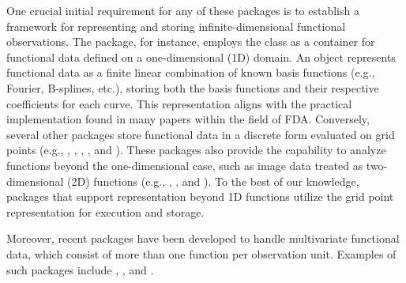 One crucial initial requirement for any of these packages is to establish a framework for representing and storing infinite-dimensional functional observations. The  package, for instance, employs the  class as a container for functional data defined on a one-dimensional (1D) domain. An  object represents functional data as a finite linear combination of known basis functions (e.g., Fourier, B-splines, etc.), storing both the basis functions and their respective coefficients for each curve. This representation aligns with the practical implementation found in many papers within the field of FDA. Conversely, several other  packages store functional data in a discrete form evaluated on grid points (e.g., , , , , and ). These packages also provide the capability to analyze functions beyond the one-dimensional case, such as image data treated as two-dimensional (2D) functions (e.g., , , and ). To the best of our knowledge, packages that support representation beyond 1D functions utilize the grid point representation for execution and storage.

Moreover, recent packages have been developed to handle multivariate functional data, which consist of more than one function per observation unit. Examples of such packages include , , and .

